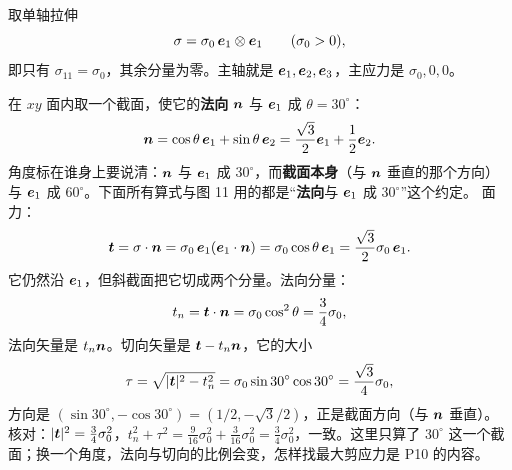 \documentclass[11pt]{ctexart}
\newcommand{\ten}[1]{\mathbf{#1}}
\let\origsubhdr\subhdr
\renewcommand{\subhdr}[1]{\par\needspace{3\baselineskip}\origsubhdr{#1}}
\begin{document}
\label{subsec:oblique}

取单轴拉伸
\[
\ten\sigma=\sigma_0\,\vect e_1\otimes\vect e_1
\qquad(\sigma_0>0),
\]
即只有 $\sigma_{11}=\sigma_0$，其余分量为零。主轴就是 $\boldsymbol{e}_1,\boldsymbol{e}_2,\boldsymbol{e}_3$，主应力是 $\sigma_0,0,0$。

在 $xy$ 面内取一个截面，使它的\textbf{法向} $\boldsymbol{n}$ 与 $\boldsymbol{e}_1$ 成 $\theta=30^\circ$：
\[
\boldsymbol{n}=\cos\theta\,\boldsymbol{e}_1+\sin\theta\,\boldsymbol{e}_2=\frac{\sqrt3}{2}\boldsymbol{e}_1+\frac12\boldsymbol{e}_2 .
\]
角度标在谁身上要说清：$\boldsymbol{n}$ 与 $\boldsymbol{e}_1$ 成 $30^\circ$，而\textbf{截面本身}（与 $\boldsymbol{n}$ 垂直的那个方向）与 $\boldsymbol{e}_1$ 成 $60^\circ$。下面所有算式与图 11 用的都是“\textbf{法向}与 $\boldsymbol{e}_1$ 成 $30^\circ$”这个约定。
面力：
\[
\vect t=\ten\sigma\cdot\vect n
=\sigma_0\,\vect e_1(\vect e_1\cdot\vect n)
=\sigma_0\cos\theta\,\vect e_1
=\frac{\sqrt3}{2}\sigma_0\,\vect e_1 .
\]
它仍然沿 $\boldsymbol{e}_1$，但斜截面把它切成两个分量。法向分量：
\[
t_n=\boldsymbol{t}\cdot\boldsymbol{n}=\sigma_0\cos^2\theta=\frac34\sigma_0,
\]
法向矢量是 $t_n\boldsymbol{n}$。切向矢量是 $\boldsymbol{t}-t_n\boldsymbol{n}$，它的大小
\[
\tau=\sqrt{|\boldsymbol{t}|^2-t_n^2}
=\sigma_0\sin30^\circ\cos30^\circ
=\frac{\sqrt3}{4}\sigma_0,
\]
方向是 $(\sin30^\circ,-\cos30^\circ)=(1/2,-\sqrt3/2)$，正是截面方向（与 $\boldsymbol{n}$ 垂直）。核对：$|\boldsymbol{t}|^2=\frac34\sigma_0^2$，$t_n^2+\tau^2=\frac{9}{16}\sigma_0^2+\frac{3}{16}\sigma_0^2=\frac34\sigma_0^2$，一致。这里只算了 $30^\circ$ 这一个截面；换一个角度，法向与切向的比例会变，怎样找最大剪应力是 P10 的内容。
\end{document}

